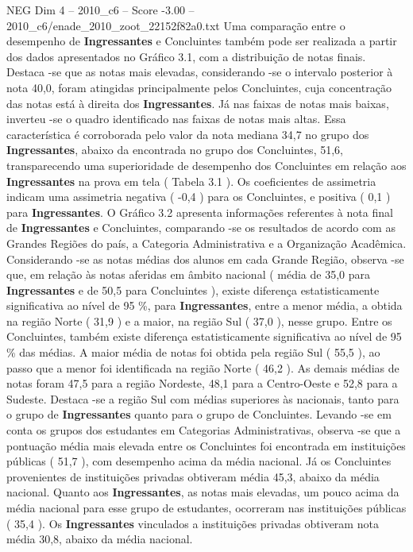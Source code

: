 \begin{textsample}{NEG Dim 4 – 2010\_c6 – Score -3.00 – 2010\_c6/enade\_2010\_zoot\_22152f82a0.txt}
Uma comparação entre o desempenho de \textbf{Ingressantes} e Concluintes também pode ser realizada a partir dos dados apresentados no Gráfico 3.1, com a distribuição de notas finais.
Destaca -se que as notas mais elevadas, considerando -se o intervalo posterior à nota 40,0, foram atingidas principalmente pelos Concluintes, cuja concentração das notas está à direita dos \textbf{Ingressantes}.
Já nas faixas de notas mais baixas, inverteu -se o quadro identificado nas faixas de notas mais altas.
Essa característica é corroborada pelo valor da nota mediana 34,7 no grupo dos \textbf{Ingressantes}, abaixo da encontrada no grupo dos Concluintes, 51,6, transparecendo uma superioridade de desempenho dos Concluintes em relação aos \textbf{Ingressantes} na prova em tela ( Tabela 3.1 ).
Os coeficientes de assimetria indicam uma assimetria negativa ( -0,4 ) para os Concluintes, e positiva ( 0,1 ) para \textbf{Ingressantes}.
O Gráfico 3.2 apresenta informações referentes à nota final de \textbf{Ingressantes} e Concluintes, comparando -se os resultados de acordo com as Grandes Regiões do país, a Categoria Administrativa e a Organização Acadêmica.
Considerando -se as notas médias dos alunos em cada Grande Região, observa -se que, em relação às notas aferidas em âmbito nacional ( média de 35,0 para \textbf{Ingressantes} e de 50,5 para Concluintes ), existe diferença estatisticamente significativa ao nível de 95 \%, para \textbf{Ingressantes}, entre a menor média, a obtida na região Norte ( 31,9 ) e a maior, na região Sul ( 37,0 ), nesse grupo.
Entre os Concluintes, também existe diferença estatisticamente significativa ao nível de 95 \% das médias.
A maior média de notas foi obtida pela região Sul ( 55,5 ), ao passo que a menor foi identificada na região Norte ( 46,2 ).
As demais médias de notas foram 47,5 para a região Nordeste, 48,1 para a Centro-Oeste e 52,8 para a Sudeste.
Destaca -se a região Sul com médias superiores às nacionais, tanto para o grupo de \textbf{Ingressantes} quanto para o grupo de Concluintes.
Levando -se em conta os grupos dos estudantes em Categorias Administrativas, observa -se que a pontuação média mais elevada entre os Concluintes foi encontrada em instituições públicas ( 51,7 ), com desempenho acima da média nacional.
Já os Concluintes provenientes de instituições privadas obtiveram média 45,3, abaixo da média nacional.
Quanto aos \textbf{Ingressantes}, as notas mais elevadas, um pouco acima da média nacional para esse grupo de estudantes, ocorreram nas instituições públicas ( 35,4 ).
Os \textbf{Ingressantes} vinculados a instituições privadas obtiveram nota média 30,8, abaixo da média nacional.

\end{textsample}
